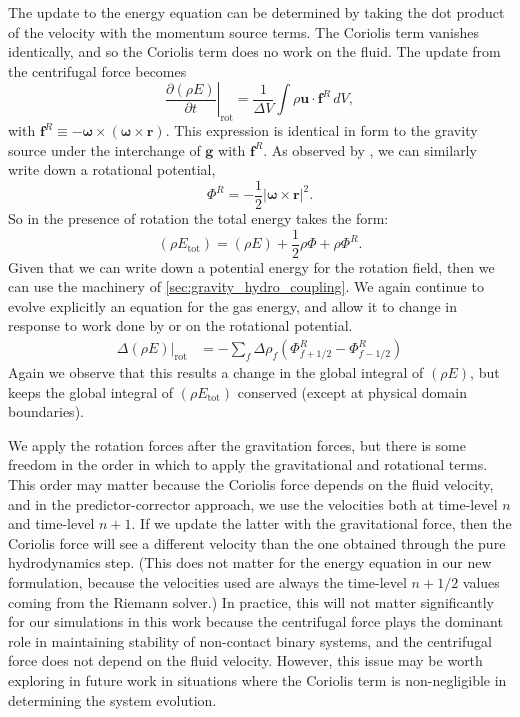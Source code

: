 \documentclass[iop]{../emulateapj}
\begin{document}
The update to the energy equation can be determined by taking the dot product of the velocity
with the momentum source terms. The Coriolis term vanishes identically, and so
the Coriolis term does no work on the fluid. The update from the centrifugal force becomes
\begin{equation}
  \left.\frac{\partial(\rho E)}{\partial t}\right|_{\text{rot}} = \frac{1}{\Delta V}\int \rho \mathbf{u} \cdot \mathbf{f}^R\, dV,
\end{equation}
with $\mathbf{f}^R \equiv  -{\bm\omega} \times \left({\bm\omega} \times \mathbf{r}\right)$. 
This expression is identical in form to the gravity source under the interchange of $\mathbf{g}$ with $\mathbf{f}^R$.
As observed by \cite{marcello:2012}, we can similarly write down a rotational potential,
\begin{equation}
  \Phi^R = -\frac{1}{2} \left| {\bm\omega} \times \mathbf{r} \right|^2.
\end{equation}
So in the presence of rotation the total energy takes the form:
\begin{equation}
  (\rho E_{\text{tot}}) = (\rho E) + \frac{1}{2} \rho \Phi + \rho \Phi^R.
\end{equation}
Given that we can write down a potential energy for the rotation field, then we can use the machinery of 
\autoref{sec:gravity_hydro_coupling}. We again continue to evolve explicitly an equation for 
the gas energy, and allow it to change in response to work done by or on the rotational potential.
\begin{align}
  \left.\Delta(\rho E)\right|_{\text{rot}} &= - \sum_{f} \Delta \rho_{f} (\Phi^R_{f+1/2} - \Phi^R_{f-1/2})
\end{align}
Again we observe that this results a change in the global integral of $(\rho E)$, but keeps 
the global integral of $(\rho E_{\text{tot}})$ conserved (except at physical domain boundaries).

We apply the rotation forces after the gravitation forces, but 
there is some freedom in the order in which to apply the gravitational and rotational terms.
This order may matter because the Coriolis force depends on the fluid velocity, and 
in the predictor-corrector approach, we use the velocities both at 
time-level $n$ and time-level $n+1$. If we update the latter with the gravitational force, 
then the Coriolis force will see a different velocity than the one obtained through the 
pure hydrodynamics step. (This does not matter for the energy equation in our new formulation,
because the velocities used are always the time-level $n+1/2$ values coming from the Riemann solver.)
In practice, this will not matter significantly for our simulations in this work 
because the centrifugal force plays the dominant role in maintaining stability of non-contact 
binary systems, and the centrifugal force does not depend on the fluid velocity.
However, this issue may be worth exploring in future work in situations where the Coriolis 
term is non-negligible in determining the system evolution.
\end{document}
